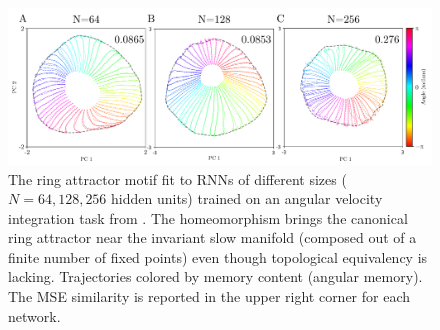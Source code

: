 \documentclass{article}
\theoremstyle{definition} \newtheorem{definition}{Definition}  \newtheorem{example}{Example}
\theoremstyle{remark} \newtheorem{remark}{Remark}
\newcounter{ct}
\begin{document}
\begin{figure}[htbp]
    \centering
    \includegraphics[width=0.75\linewidth]{avi_rnn_recttanh}
    \caption{The ring attractor motif fit to RNNs of different sizes ($N=64,128,256$ hidden units) trained on an angular velocity integration task from \citet{Sagodi2024a}.
    The homeomorphism brings the canonical ring attractor near the invariant slow manifold (composed out of a finite number of fixed points) even though topological equivalency is lacking.
    Trajectories colored by memory content (angular memory).
    The MSE similarity is reported in the upper right corner for each network.
    }
    \label{fig:avi_rnn_recttanh}
\end{figure}
\end{document}
